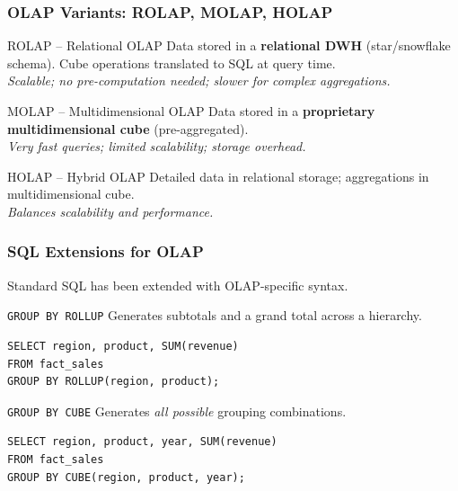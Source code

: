 \begin{frame}
  \frametitle{OLAP Variants: ROLAP, MOLAP, HOLAP}

  \begin{block}{ROLAP -- Relational OLAP}
    Data stored in a \textbf{relational DWH} (star/snowflake schema).
    Cube operations translated to SQL at query time.\\
    \textit{Scalable; no pre-computation needed; slower for complex aggregations.}
  \end{block}

  \begin{block}{MOLAP -- Multidimensional OLAP}
    Data stored in a \textbf{proprietary multidimensional cube} (pre-aggregated).\\
    \textit{Very fast queries; limited scalability; storage overhead.}
  \end{block}

  \begin{block}{HOLAP -- Hybrid OLAP}
    Detailed data in relational storage; aggregations in multidimensional cube.\\
    \textit{Balances scalability and performance.}
  \end{block}

\end{frame}

\begin{frame}[fragile]
  \frametitle{SQL Extensions for OLAP}

  Standard SQL has been extended with OLAP-specific syntax.

  \begin{block}{\texttt{GROUP BY ROLLUP}}
    Generates subtotals and a grand total across a hierarchy.
    \begin{lstlisting}[style=sqlstyle]
SELECT region, product, SUM(revenue)
FROM fact_sales
GROUP BY ROLLUP(region, product);
    \end{lstlisting}
  \end{block}

  \begin{block}{\texttt{GROUP BY CUBE}}
    Generates \textit{all possible} grouping combinations.
    \begin{lstlisting}[style=sqlstyle]
SELECT region, product, year, SUM(revenue)
FROM fact_sales
GROUP BY CUBE(region, product, year);
    \end{lstlisting}
  \end{block}

\end{frame}

